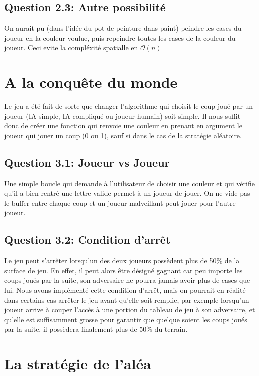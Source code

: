 \documentclass[11pt]{article}
\begin{document}
    \subsection*{Question 2.3: Autre possibilité}
    On aurait pu (dans l'idée du pot de peinture dans paint) peindre les cases du joueur en la couleur voulue, puis repeindre toutes les cases de la couleur du joueur. Ceci evite la compléxité spatialle en $\mathcal{O}(n)$

    \section{A la conquête du monde}

    Le jeu a été fait de sorte que changer l'algorithme qui choisit le coup joué par un joueur (IA simple, IA compliqué ou joueur humain) soit simple. Il nous suffit donc de créer une fonction qui renvoie une couleur en prenant en argument le joueur qui jouer un coup (0 ou 1), sauf si dans le cas de la stratégie aléatoire.

    \subsection*{Question 3.1: Joueur vs Joueur}

    Une simple boucle qui demande à l'utilisateur de choisir une couleur et qui vérifie qu'il a bien rentré une lettre valide permet à un joueur de jouer. On ne vide pas le buffer entre chaque coup et un joueur malveillant peut jouer pour l'autre joueur.

    \subsection*{Question 3.2: Condition d'arrêt}

    Le jeu peut s'arrêter lorsqu'un des deux joueurs possèdent plus de 50\% de la surface de jeu. En effet, il peut alors être désigné gagnant car peu importe les coups joués par la suite, son adversaire ne pourra jamais avoir plus de cases que lui. Nous avons implémenté cette condition d'arrêt, mais on pourrait en réalité dans certains cas arrêter le jeu avant qu'elle soit remplie, par exemple lorsqu'un joueur arrive à couper l'accès à une portion du tableau de jeu à son adversaire, et qu'elle est suffisamment grosse pour garantir que quelque soient les coups joués par la suite, il possèdera finalement plus de 50\% du terrain.

    \section{La stratégie de l'aléa}
\end{document}
